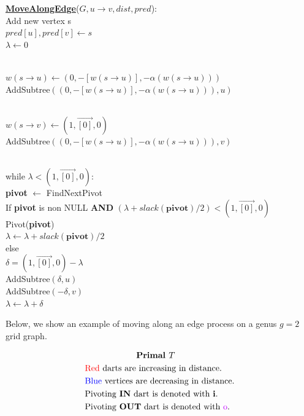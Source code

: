 \documentclass{article}
\begin{document}
\begin{center}
\begin{algorithm}
\textbf{\underline{MoveAlongEdge}}($G, u \rightarrow v, dist, pred$): \\ \quad
Add new vertex s \\ \quad
$pred[u], pred[v] \leftarrow s$ \\ \quad
$\lambda \leftarrow 0$ \\ \\ \quad

$w(s \rightarrow u) \leftarrow ( 0, -[w(s \rightarrow u)], 
-\alpha(w(s \rightarrow u)) )$ \\ \quad
AddSubtree$(( 0, -[w(s \rightarrow u)], 
-\alpha(w(s \rightarrow u)) ), u)$ \\ \\ \quad

$w(s \rightarrow v) \leftarrow ( 1, \vec{[0]}, 0 )$ \\ \quad
AddSubtree$(( 0, -[w(s \rightarrow u)], 
-\alpha(w(s \rightarrow u)) ), v)$ \\ \\ \quad

while $\lambda < ( 1, \vec{[0]}, 0 )$: \\ \quad \quad
    \textbf{pivot} $\leftarrow $ FindNextPivot \\ \quad \quad
    If \textbf{pivot} is non NULL \textbf{AND} 
    $(\lambda + slack(\textbf{pivot}) / 2) < ( 1, \vec{[0]}, 0 )$ \\ \qquad \quad
        Pivot(\textbf{pivot}) \\ \qquad \quad
        $\lambda \leftarrow \lambda + slack(\textbf{pivot}) / 2$ \\ \quad \quad
    else \\ \qquad \quad
        $\delta = ( 1, \vec{[0]}, 0 ) - \lambda$ \\ \qquad \quad
        AddSubtree$(\delta, u)$ \\ \qquad \quad
        AddSubtree$(-\delta, v)$ \\ \qquad \quad
        $\lambda \leftarrow \lambda + \delta$ \\
\end{algorithm}
\end{center}
\vspace{1cm}
Below, we show an example of moving along an edge process on a genus $g=2$ grid graph. \\
\begin{minipage}[t]{0.48\linewidth}
\begin{align*}
& \qquad \qquad \qquad \textbf{Primal $T$} \\
& \text{{\color{red} Red} darts are increasing in distance.} \\
& \text{{\color{blue} Blue} vertices are decreasing in distance.} \\
& \text{Pivoting \textbf{IN} dart is denoted with \textbf{i}.} \\
& \text{Pivoting \textbf{OUT} dart is denoted with {\color{electricpurple} o}.} \\
\end{align*}
\end{minipage}
\end{document}
